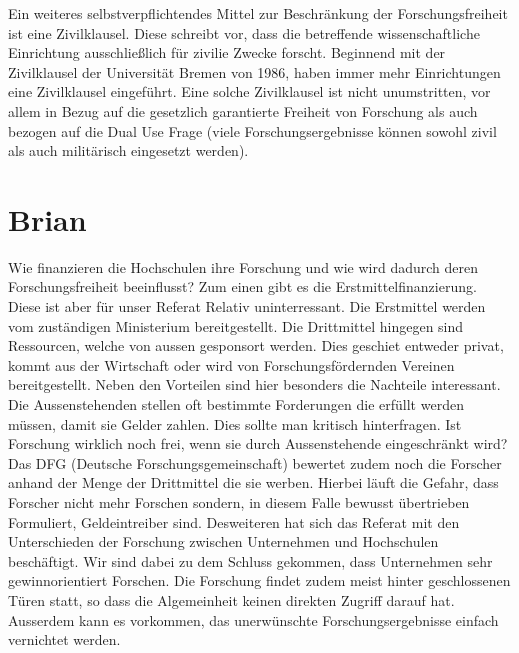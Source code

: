 \documentclass{pmwk}
\begin{document}
Ein weiteres selbstverpflichtendes Mittel zur Beschränkung der Forschungsfreiheit ist eine Zivilklausel. Diese schreibt vor, dass die betreffende wissenschaftliche Einrichtung ausschließlich für zivilie Zwecke forscht. Beginnend mit der Zivilklausel der Universität Bremen von 1986, haben immer mehr Einrichtungen eine Zivilklausel eingeführt. Eine solche Zivilklausel ist nicht unumstritten, vor allem in Bezug auf die gesetzlich garantierte Freiheit von Forschung als auch bezogen auf die Dual Use Frage (viele Forschungsergebnisse können sowohl zivil als auch militärisch eingesetzt werden). 

\section*{Brian}
Wie finanzieren die Hochschulen ihre Forschung und wie wird dadurch deren Forschungsfreiheit beeinflusst? Zum einen gibt es die Erstmittelfinanzierung. Diese ist aber für unser Referat Relativ uninterressant. Die Erstmittel werden vom zuständigen Ministerium bereitgestellt. Die Drittmittel hingegen sind Ressourcen, welche von aussen gesponsort werden. Dies geschiet entweder privat, kommt aus der Wirtschaft oder wird von Forschungsfördernden Vereinen bereitgestellt. Neben den Vorteilen sind hier besonders die Nachteile interessant. Die Aussenstehenden stellen oft bestimmte Forderungen die erfüllt werden müssen, damit sie Gelder zahlen. Dies sollte man kritisch hinterfragen. Ist Forschung wirklich noch frei, wenn sie durch Aussenstehende eingeschränkt wird? Das DFG (Deutsche Forschungsgemeinschaft) bewertet zudem noch die Forscher anhand der Menge der Drittmittel die sie werben. Hierbei läuft die Gefahr, dass Forscher nicht mehr Forschen sondern, in diesem Falle bewusst übertrieben Formuliert, Geldeintreiber sind. Desweiteren hat sich das Referat mit den Unterschieden der Forschung zwischen Unternehmen und Hochschulen beschäftigt. Wir sind dabei zu dem Schluss gekommen, dass Unternehmen sehr gewinnorientiert Forschen. Die Forschung findet zudem meist hinter geschlossenen Türen statt, so dass die Algemeinheit keinen direkten Zugriff darauf hat. Ausserdem kann es vorkommen, das unerwünschte Forschungsergebnisse einfach vernichtet werden.
\end{document}
